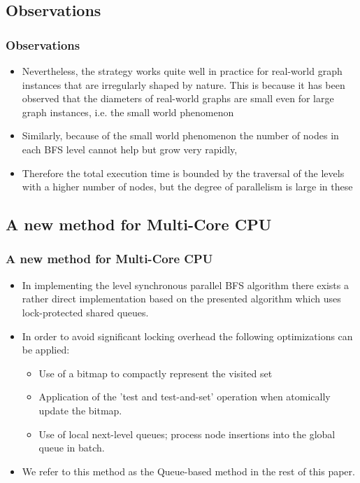 \documentclass{beamer}
\begin{document}
\begin{frame}
\subsection{Observations}
\frametitle{Observations}
\begin{itemize}
\item Nevertheless, the strategy
works quite well in practice for real-world graph instances that are irregularly shaped by nature. This is because it has been observed that the diameters of real-world graphs are small even for large graph instances, i.e. the small world
phenomenon
\item Similarly, because of the small world phenomenon the number of nodes in each BFS level cannot help but grow very rapidly,
\item Therefore the total execution time
is bounded by the traversal of the levels with a higher number of nodes, but the degree of parallelism is large in these
\end{itemize}
\end{frame}
\begin{frame}
\section{A new method for Multi-Core CPU}
\frametitle{A new method for Multi-Core CPU}
\begin{itemize}
\item In implementing the level synchronous parallel BFS algorithm there exists a rather direct implementation based on the presented algorithm which uses lock-protected shared queues.
\item In order to avoid significant locking overhead the following optimizations can be applied:
	\begin{itemize}
		\item Use of a bitmap to compactly represent the visited set
		\item Application of the 'test and test-and-set' operation when atomically update the bitmap.
		\item Use of local next-level queues; process node insertions into the global queue in batch.
	\end{itemize}
\item We refer to this method as the Queue-based method in the rest of this paper.
\end{itemize}
\end{frame}
\end{document}
